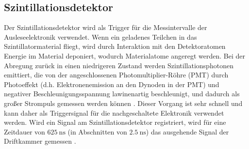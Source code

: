 

\subsection{Szintillationsdetektor}\label{sec:szinti_theorie}

Der Szintillationsdetektor wird als Trigger für die Messintervalle der Ausleseelektronik verwendet. Wenn ein geladenes Teilchen in das Szintillatormaterial fliegt, wird durch Interaktion mit den Detektoratomen Energie im Material deponiert, wodurch Materialatome angeregt werden. Bei der Abregung zurück in einen niedrigeren Zustand werden Szintillationsphotonen emittiert, die von der angeschlossenen Photomultiplier-Röhre (PMT) durch Photoeffekt (d.h. Elektronenemission an den Dynoden in der PMT) und negativer Beschleunigungsspannung lawinenartig beschleunigt, und dadurch als großer Strompuls gemessen werden können \cite[497-500]{kolanoskiwermerdetektoren}. Dieser Vorgang ist sehr schnell \cite[513]{kolanoskiwermerdetektoren} und kann daher als Triggersignal für die nachgeschaltete Elektronik verwendet werden. Wird ein Signal am Szintillationsdetektor registriert, wird für eine Zeitdauer von $\SI{625}{\nano\s}$ (in Abschnitten von $\SI{2,5}{\nano\s}$) das ausgehende Signal der Driftkammer gemessen \cite[5]{515versuchsanleitung}.

